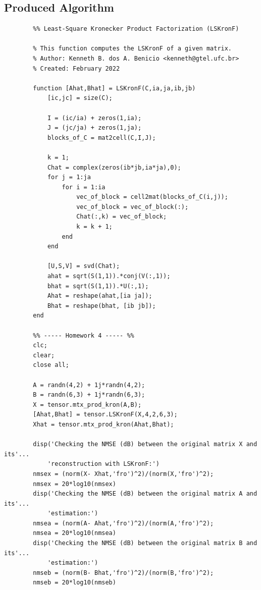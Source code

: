 \documentclass[a4paper,10pt]{article}
\begin{document}
    \newpage
    \subsection*{Produced Algorithm}

    \begin{verbatim}
        %% Least-Square Kronecker Product Factorization (LSKronF)

        % This function computes the LSKronF of a given matrix.   
        % Author: Kenneth B. dos A. Benicio <kenneth@gtel.ufc.br>
        % Created: February 2022

        function [Ahat,Bhat] = LSKronF(C,ia,ja,ib,jb)
            [ic,jc] = size(C);
            
            I = (ic/ia) + zeros(1,ia);
            J = (jc/ja) + zeros(1,ja);
            blocks_of_C = mat2cell(C,I,J);
            
            k = 1;
            Chat = complex(zeros(ib*jb,ia*ja),0);
            for j = 1:ja
                for i = 1:ia
                    vec_of_block = cell2mat(blocks_of_C(i,j));
                    vec_of_block = vec_of_block(:);
                    Chat(:,k) = vec_of_block;
                    k = k + 1;
                end
            end
            
            [U,S,V] = svd(Chat);
            ahat = sqrt(S(1,1)).*conj(V(:,1));
            bhat = sqrt(S(1,1)).*U(:,1);
            Ahat = reshape(ahat,[ia ja]);
            Bhat = reshape(bhat, [ib jb]);
        end

        %% ----- Homework 4 ----- %%
        clc;
        clear;
        close all;

        A = randn(4,2) + 1j*randn(4,2);
        B = randn(6,3) + 1j*randn(6,3);
        X = tensor.mtx_prod_kron(A,B);
        [Ahat,Bhat] = tensor.LSKronF(X,4,2,6,3);
        Xhat = tensor.mtx_prod_kron(Ahat,Bhat);

        disp('Checking the NMSE (dB) between the original matrix X and its'...
            'reconstruction with LSKronF:')
        nmsex = (norm(X- Xhat,'fro')^2)/(norm(X,'fro')^2);
        nmsex = 20*log10(nmsex)
        disp('Checking the NMSE (dB) between the original matrix A and its'...
            'estimation:')
        nmsea = (norm(A- Ahat,'fro')^2)/(norm(A,'fro')^2);
        nmsea = 20*log10(nmsea)
        disp('Checking the NMSE (dB) between the original matrix B and its'...
            'estimation:')
        nmseb = (norm(B- Bhat,'fro')^2)/(norm(B,'fro')^2);
        nmseb = 20*log10(nmseb)


\end{verbatim}
\end{document}

